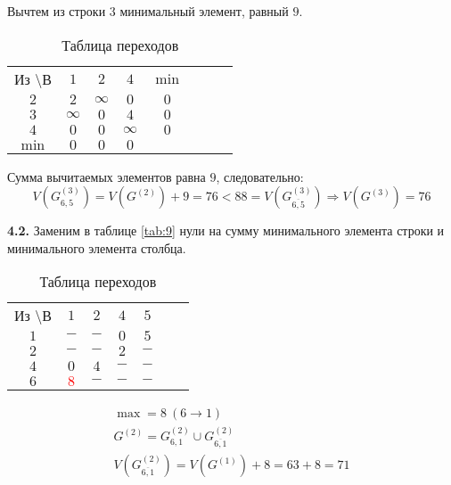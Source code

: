 Вычтем из строки $3$ минимальный элемент, равный $9$.

\begin{table}[H]
\begin{center}
	\def\tabcolsep{15pt}
	\caption{Таблица переходов}
	\label{tab:112}
	\begin{tabular}{|c||c|c|c|c|c|c|c|}
		\hline
		Из \textbackslash В & $1$ & $2$ & $4$ & $\min$ \\
		\hhline{|=#=|=|=|=|}
		$2$ & $2$ & $\infty$ & $0$ & $0$ \\
		\hline
		$3$ & $\infty$ & $0$ & $4$ & $0$  \\ 
		\hline
		$4$ & $0$ & $0$ & $\infty$ & $0$  \\
		\hhline{|=#=|=|=|=|}
		$\min$ & $0$ & $0$ & $0$ & \\ 
		\hline
	\end{tabular}
\end{center}
\end{table}

Сумма вычитаемых элементов равна $9$, следовательно:
\begin{equation*}
V(G_{6,5}^{(3)}) = V(G^{(2)}) + 9 = 76 < 88 = V(G_{\overline{6,5}}^{(3)})\Rightarrow V(G^{(3)}) = 76
\end{equation*}


\textbf{4.2.} Заменим в таблице \ref{tab:9} нули на сумму минимального элемента строки и минимального элемента столбца. 

\begin{table}[H]
\begin{center}
	\def\tabcolsep{15pt}
	\caption{Таблица переходов}
	\label{tab:11}
	\begin{tabular}{|c||c|c|c|c|c|c|}
		\hline
		Из \textbackslash В & $1$ & $2$ & $4$ & $5$ \\
		\hhline{|=#=|=|=|=|}
		$1$ & $-$ & $-$ & $0$ & $5$ \\
		\hline
		$2$ & $-$ & $-$ & $2$ & $-$ \\
		\hline
		$4$ & $0$ & $4$ & $-$ & $-$ \\
		\hline
		$6$ & \textcolor{red}{\boldmath$8$} & $-$ & $-$ & $-$ \\
		\hline
	\end{tabular}
\end{center}
\end{table}

\begin{gather*}
\max = 8\ (6 \rightarrow 1) \\
G^{(2)} = G_{6,1}^{(2)} \cup G_{\overline{6,1}}^{(2)} \\
V(G_{\overline{6,1}}^{(2)}) = V(G^{(1)}) + 8 = 63 + 8 = 71
\end{gather*}

